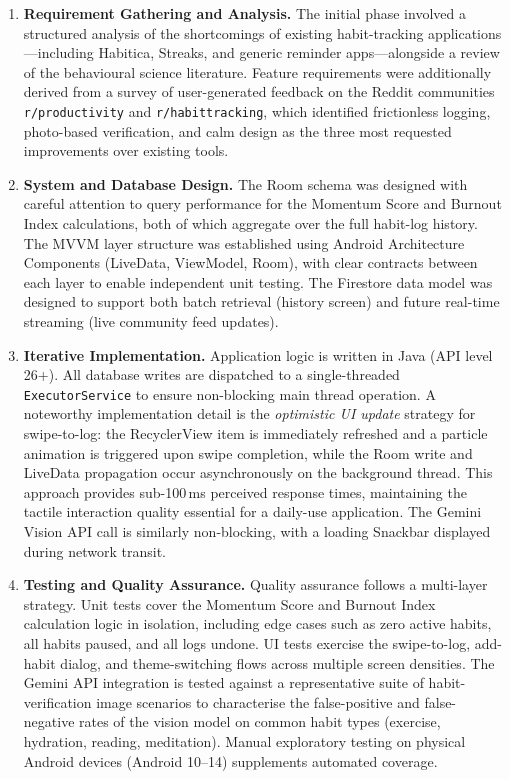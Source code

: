 \documentclass[12pt,a4paper]{article}
\begin{document}
\begin{enumerate}[leftmargin=1.5em, itemsep=6pt]

    \item \textbf{Requirement Gathering and Analysis.}
    The initial phase involved a structured analysis of the shortcomings of existing
    habit-tracking applications---including Habitica, Streaks, and generic reminder
    apps---alongside a review of the behavioural science literature. Feature requirements
    were additionally derived from a survey of user-generated feedback on the Reddit
    communities \texttt{r/productivity} and \texttt{r/habittracking}, which identified
    frictionless logging, photo-based verification, and calm design as the three most
    requested improvements over existing tools.

    \item \textbf{System and Database Design.}
    The Room schema was designed with careful attention to query performance for the
    Momentum Score and Burnout Index calculations, both of which aggregate over the
    full habit-log history. The MVVM layer structure was established using Android
    Architecture Components (LiveData, ViewModel, Room), with clear contracts between
    each layer to enable independent unit testing. The Firestore data model was designed
    to support both batch retrieval (history screen) and future real-time streaming
    (live community feed updates).

    \item \textbf{Iterative Implementation.}
    Application logic is written in Java (API level 26+). All database writes are
    dispatched to a single-threaded \texttt{ExecutorService} to ensure non-blocking
    main thread operation. A noteworthy implementation detail is the \textit{optimistic
    UI update} strategy for swipe-to-log: the RecyclerView item is immediately refreshed
    and a particle animation is triggered upon swipe completion, while the Room write and
    LiveData propagation occur asynchronously on the background thread. This approach
    provides sub-100\,ms perceived response times, maintaining the tactile interaction
    quality essential for a daily-use application. The Gemini Vision API call is similarly
    non-blocking, with a loading Snackbar displayed during network transit.

    \item \textbf{Testing and Quality Assurance.}
    Quality assurance follows a multi-layer strategy. Unit tests cover the Momentum
    Score and Burnout Index calculation logic in isolation, including edge cases such
    as zero active habits, all habits paused, and all logs undone. UI tests exercise
    the swipe-to-log, add-habit dialog, and theme-switching flows across multiple
    screen densities. The Gemini API integration is tested against a representative
    suite of habit-verification image scenarios to characterise the false-positive
    and false-negative rates of the vision model on common habit types (exercise,
    hydration, reading, meditation). Manual exploratory testing on physical Android
    devices (Android 10--14) supplements automated coverage.

\end{enumerate}
\end{document}
